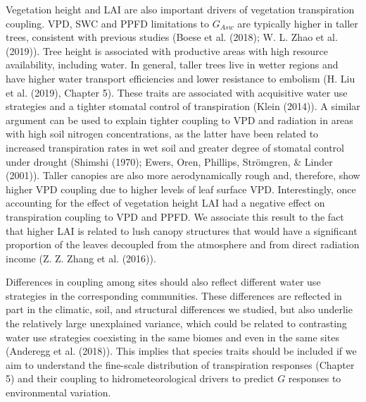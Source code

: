 \documentclass[11pt,twoside]{reedthesis}
\begin{document}
Vegetation height and LAI are also important drivers of vegetation
transpiration coupling. VPD, SWC and PPFD limitations to \(G_{Asw}\) are
typically higher in taller trees, consistent with previous studies
(Boese et al. (2018); W. L. Zhao et al. (2019)). Tree height is
associated with productive areas with high resource availability,
including water. In general, taller trees live in wetter regions and
have higher water transport efficiencies and lower resistance to
embolism (H. Liu et al. (2019), Chapter 5). These traits are associated
with acquisitive water use strategies and a tighter stomatal control of
transpiration (Klein (2014)). A similar argument can be used to explain
tighter coupling to VPD and radiation in areas with high soil nitrogen
concentrations, as the latter have been related to increased
transpiration rates in wet soil and greater degree of stomatal control
under drought (Shimshi (1970); Ewers, Oren, Phillips, Strömgren, \&
Linder (2001)). Taller canopies are also more aerodynamically rough and,
therefore, show higher VPD coupling due to higher levels of leaf surface
VPD. Interestingly, once accounting for the effect of vegetation height
LAI had a negative effect on transpiration coupling to VPD and PPFD. We
associate this result to the fact that higher LAI is related to lush
canopy structures that would have a significant proportion of the leaves
decoupled from the atmosphere and from direct radiation income (Z. Z.
Zhang et al. (2016)).\par

Differences in coupling among sites should also reflect different water
use strategies in the corresponding communities. These differences are
reflected in part in the climatic, soil, and structural differences we
studied, but also underlie the relatively large unexplained variance,
which could be related to contrasting water use strategies coexisting in
the same biomes and even in the same sites (Anderegg et al. (2018)).
This implies that species traits should be included if we aim to
understand the fine-scale distribution of transpiration responses
(Chapter 5) and their coupling to hidrometeorological drivers to predict
\(G\) responses to environmental variation.\par
\end{document}
